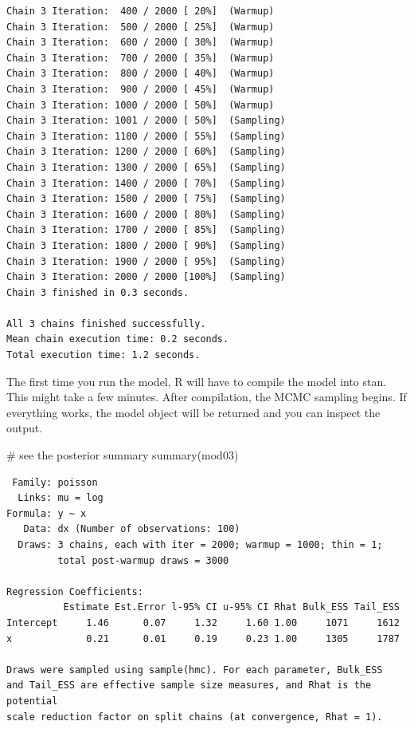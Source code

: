 \documentclass[
  13,
  letterpaper,
]{report}
\newenvironment{Shaded}{\begin{snugshade}}{\end{snugshade}}
\newcommand{\CommentTok}[1]{\textcolor[rgb]{0.37,0.37,0.37}{#1}}
\newcommand{\FunctionTok}[1]{\textcolor[rgb]{0.28,0.35,0.67}{#1}}
\newcommand{\NormalTok}[1]{\textcolor[rgb]{0.00,0.23,0.31}{#1}}
\begin{document}
\begin{verbatim}
Chain 3 Iteration:  400 / 2000 [ 20%]  (Warmup) 
Chain 3 Iteration:  500 / 2000 [ 25%]  (Warmup) 
Chain 3 Iteration:  600 / 2000 [ 30%]  (Warmup) 
Chain 3 Iteration:  700 / 2000 [ 35%]  (Warmup) 
Chain 3 Iteration:  800 / 2000 [ 40%]  (Warmup) 
Chain 3 Iteration:  900 / 2000 [ 45%]  (Warmup) 
Chain 3 Iteration: 1000 / 2000 [ 50%]  (Warmup) 
Chain 3 Iteration: 1001 / 2000 [ 50%]  (Sampling) 
Chain 3 Iteration: 1100 / 2000 [ 55%]  (Sampling) 
Chain 3 Iteration: 1200 / 2000 [ 60%]  (Sampling) 
Chain 3 Iteration: 1300 / 2000 [ 65%]  (Sampling) 
Chain 3 Iteration: 1400 / 2000 [ 70%]  (Sampling) 
Chain 3 Iteration: 1500 / 2000 [ 75%]  (Sampling) 
Chain 3 Iteration: 1600 / 2000 [ 80%]  (Sampling) 
Chain 3 Iteration: 1700 / 2000 [ 85%]  (Sampling) 
Chain 3 Iteration: 1800 / 2000 [ 90%]  (Sampling) 
Chain 3 Iteration: 1900 / 2000 [ 95%]  (Sampling) 
Chain 3 Iteration: 2000 / 2000 [100%]  (Sampling) 
Chain 3 finished in 0.3 seconds.

All 3 chains finished successfully.
Mean chain execution time: 0.2 seconds.
Total execution time: 1.2 seconds.
\end{verbatim}

The first time you run the model, R will have to compile the model into
stan. This might take a few minutes. After compilation, the MCMC
sampling begins. If everything works, the model object will be returned
and you can inspect the output.

\begin{Shaded}
\begin{Highlighting}[]
\CommentTok{\# see the posterior summary}
\FunctionTok{summary}\NormalTok{(mod03)}
\end{Highlighting}
\end{Shaded}

\begin{verbatim}
 Family: poisson 
  Links: mu = log 
Formula: y ~ x 
   Data: dx (Number of observations: 100) 
  Draws: 3 chains, each with iter = 2000; warmup = 1000; thin = 1;
         total post-warmup draws = 3000

Regression Coefficients:
          Estimate Est.Error l-95% CI u-95% CI Rhat Bulk_ESS Tail_ESS
Intercept     1.46      0.07     1.32     1.60 1.00     1071     1612
x             0.21      0.01     0.19     0.23 1.00     1305     1787

Draws were sampled using sample(hmc). For each parameter, Bulk_ESS
and Tail_ESS are effective sample size measures, and Rhat is the potential
scale reduction factor on split chains (at convergence, Rhat = 1).
\end{verbatim}
\end{document}
